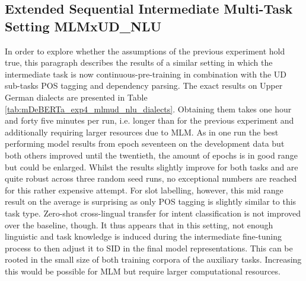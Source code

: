 \documentclass[11pt,a4paper,twoside,openright]{scrbook}
\begin{document}
\begin{table}[!ht]
\caption{Results for the extended sequential intermediate multi-task UDxNER\_NLU experiment with mDeBERTa according to Upper German dialects over three random seeds, Avg. = average on languages without English, German and Swiss German, Diff. = average performance difference to mDeBERTa baseline, sd = standard deviation}
\label{tab:mDeBERTa_exp4_udner_nlu_dialects}
\end{table}






\subsection{Extended Sequential Intermediate Multi-Task Setting MLMxUD\_NLU}

In order to explore whether the assumptions of the previous experiment hold true, this paragraph describes the results of a similar setting in which the intermediate task is now continuous-pre-training in combination with the UD sub-tasks POS tagging and dependency parsing. The exact results on Upper German dialects are presented in Table \ref{tab:mDeBERTa_exp4_mlmud_nlu_dialects}. Obtaining them takes one hour and forty five minutes per run, i.e. longer than for the previous experiment and additionally requiring larger resources due to MLM. As in one run the best performing model results from epoch seventeen on the development data but both others improved until the twentieth, the amount of epochs is in good range but could be enlarged. Whilst the results slightly improve for both tasks and are quite robust across three random seed runs, no exceptional numbers are reached for this rather expensive attempt. For slot labelling, however, this mid range result on the average is surprising as only POS tagging is slightly similar to this task type. Zero-shot cross-lingual transfer for intent classification is not improved over the baseline, though. It thus appears that in this setting, not enough linguistic and task knowledge is induced during the intermediate fine-tuning process to then adjust it to SID in the final model representations. This can be rooted in the small size of both training corpora of the auxiliary tasks. Increasing this would be possible for MLM but require larger computational resources.
\end{document}
